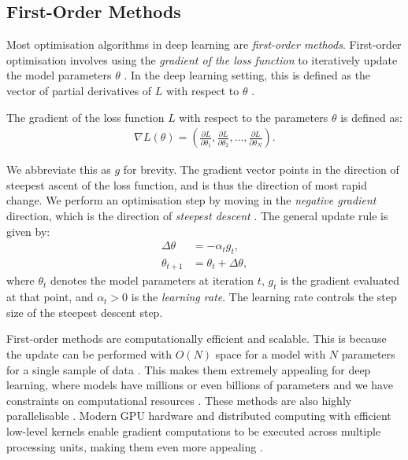 \subsection{First-Order Methods}
\label{ssec:first_order_methods}

Most optimisation algorithms in deep learning are \textit{first-order methods}. First-order optimisation involves using the \textit{gradient of the loss function} to iteratively update the model parameters $\theta$ \citep{deep_learning_book, mml_book}. In the deep learning setting, this is defined as the vector of partial derivatives of $L$ with respect to $\theta$ \citep{deep_learning_book}.
\begin{definition}
    The gradient of the loss function $L$ with respect to the parameters $\theta$ is defined as:
    \begin{align}
        \nabla L(\theta) = \left(\frac{\partial L}{\partial \theta_1}, \frac{\partial L}{\partial \theta_2}, \ldots, \frac{\partial L}{\partial \theta_N}\right).
    \end{align}
\end{definition}

We abbreviate this as $g$ for brevity. The gradient vector points in the direction of steepest ascent of the loss function, and is thus the direction of most rapid change. We perform an optimisation step by moving in the \textit{negative gradient} direction, which is the direction of \textit{steepest descent} \citep{deep_learning_book, mml_book, NoceWrig06}. The general update rule is given by:
\begin{align}
    \Delta \theta &= - \alpha_t g_t, \\
    \theta_{t+1} &= \theta_t + \Delta \theta,
    \label{equation:first_order_update}
\end{align}
where $\theta_t$ denotes the model parameters at iteration $t$, $g_t$ is the gradient evaluated at that point, and $\alpha_t > 0$ is the \textit{learning rate}. The learning rate controls the step size of the steepest descent step.

First-order methods are computationally efficient and scalable. This is because the update can be performed with $O(N)$ space for a model with $N$ parameters for a single sample of data \citep{deep_learning_book, mml_book}. This makes them extremely appealing for deep learning, where models have millions or even billions of parameters and we have constraints on computational resources \citep{deep_learning_book}. These methods are also highly parallelisable \citep{pytorch}. Modern GPU hardware and distributed computing with efficient low-level kernels enable gradient computations to be executed across multiple processing units, making them even more appealing \citep{pytorch}.

